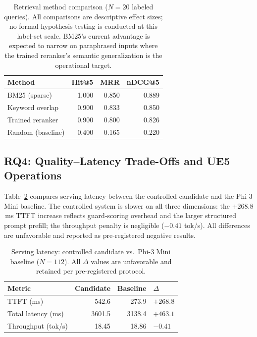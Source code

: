 \documentclass[conference]{IEEEtran}
\begin{document}
\begin{table}[!t]
\renewcommand{\arraystretch}{1.15}
\caption{Retrieval method comparison ($N{=}20$ labeled queries).
All comparisons are descriptive effect sizes; no formal hypothesis
testing is conducted at this label-set scale. BM25's current
advantage is expected to narrow on paraphrased inputs where the
trained reranker's semantic generalization is the operational
target.}
\label{tab:retr}
\centering
\setlength{\tabcolsep}{4pt}
\begin{tabular}{lrrr}
\toprule
Method & Hit@5 & MRR & nDCG@5 \\
\midrule
BM25 (sparse)          & 1.000 & 0.850 & 0.889 \\
Keyword overlap        & 0.900 & 0.833 & 0.850 \\
Trained reranker       & 0.900 & 0.800 & 0.826 \\
Random (baseline)      & 0.400 & 0.165 & 0.220 \\
\bottomrule
\end{tabular}
\end{table}

\subsection{RQ4: Quality--Latency Trade-Offs and UE5 Operations}

Table~\ref{tab:serving} compares serving latency between the
controlled candidate and the Phi-3 Mini baseline. The controlled
system is slower on all three dimensions: the $+268.8$\,ms TTFT
increase reflects guard-scoring overhead and the larger
structured prompt prefill; the throughput penalty is negligible
($-0.41$ tok/s). All differences are unfavorable and reported
as pre-registered negative results.

\begin{table}[!t]
\renewcommand{\arraystretch}{1.2}
\caption{Serving latency: controlled candidate vs.\ Phi-3 Mini
baseline ($N=112$). All $\Delta$ values are unfavorable and
retained per pre-registered protocol.}
\label{tab:serving}
\centering
\setlength{\tabcolsep}{4pt}
\begin{tabular}{lrrl}
\toprule
Metric & Candidate & Baseline & $\Delta$ \\
\midrule
TTFT (ms)          & 542.6 & 273.9 & $+268.8$ \\
Total latency (ms) & 3601.5 & 3138.4 & $+463.1$ \\
Throughput (tok/s) & 18.45  & 18.86  & $-0.41$ \\
\bottomrule
\end{tabular}
\end{table}
\end{document}
